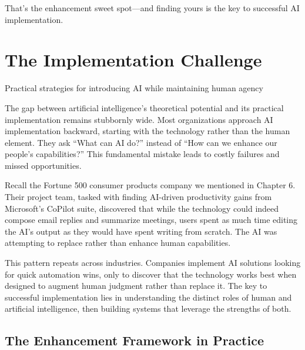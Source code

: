 \documentclass[
  Letterpaper,
]{scrbook}
\begin{document}
That's the enhancement sweet spot---and finding yours is the key to
successful AI implementation.


\chapter{The Implementation
Challenge}\label{the-implementation-challenge}

Practical strategies for introducing AI while maintaining human agency

\hfill\break

The gap between artificial
intelligence's theoretical
potential and its practical implementation remains stubbornly wide. Most
organizations approach AI implementation backward, starting with the
technology rather than the human element. They ask ``What can AI do?''
instead of ``How can we enhance our people's capabilities?'' This
fundamental mistake leads to costly failures and missed opportunities.

Recall the Fortune 500 consumer products company we mentioned in Chapter
6. Their project team, tasked with finding AI-driven productivity gains
from Microsoft's CoPilot suite, discovered
that while the technology could indeed compose email replies and
summarize meetings, users spent as much time editing the AI's output as
they would have spent writing from scratch. The AI was attempting to
replace rather than enhance human
capabilities.

This pattern repeats across industries. Companies implement AI solutions
looking for quick automation wins, only to
discover that the technology works best when designed to augment human
judgment rather than replace
it. The key to successful implementation lies in understanding the
distinct roles of human and artificial intelligence, then building
systems that leverage the strengths of both.

\section{\texorpdfstring{The
Enhancement Framework in
Practice}{The Enhancement Framework in Practice}}\label{the-enhancement-framework-in-practice}
\end{document}
